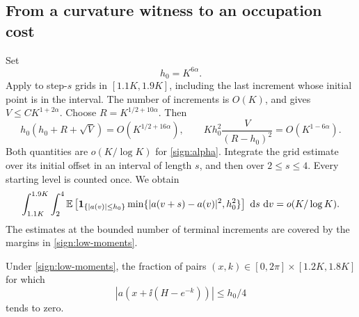 \subsection{From a curvature witness to an occupation cost}

Set
\begin{equation}\label{sign:h0}
 h_0=K^{6\alpha}.
\end{equation}
Apply  to step-\(s\) grids in
\([1.1K,1.9K]\), including the last increment whose initial point is
in the interval.  The number of increments is \(O(K)\), and
 gives \(V\le CK^{1+2\alpha}\).  Choose
\(R=K^{1/2+10\alpha}\).  Then
\[
 h_0(h_0+R+\sqrt V)=O(K^{1/2+16\alpha}),\qquad
 K h_0^2\frac{V}{(R-h_0)^2}=O(K^{1-6\alpha}).
\]
Both quantities are \(o(K/\log K)\) for \eqref{sign:alpha}.
Integrate the grid estimate over its initial offset in an interval of
length \(s\), and then over \(2\le s\le4\).  Every starting level is
counted once.  We obtain
\begin{equation}\label{sign:occupation-cost}
 \int_{1.1K}^{1.9K}\int_2^4
 \mathbb E\left[\mathbf 1_{\{|a(v)|\le h_0\}}
 \min\{|a(v+s)-a(v)|^2,h_0^2\}\right]\,\,\mathrm d s\,\,\mathrm d v
       =o(K/\log K).
\end{equation}
The estimates at the bounded number of terminal increments are covered
by the margins in \eqref{sign:low-moments}.

\begin{lemma}
\label{sign:witness-cost}
Under \eqref{sign:low-moments}, the fraction of pairs
\((x,k)\in[0,2\pi]\times[1.2K,1.8K]\) for which
\[
 |a(x+\ii(H-e^{-k}))|\le h_0/4
\]
tends to zero.
\end{lemma}

